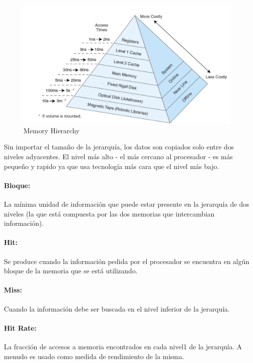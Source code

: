 \begin{figure}[ht]
	\centering
	\includegraphics[width=1\textwidth]{imagenes/memory-heriarchy}
	\caption{Memory Hierarchy}
	\label{fig:memory-hierarchy}
\end{figure}

Sin importar el tamaño de la jerarquía, los datos son copiados solo entre dos niveles adyacentes. El nivel más alto - el más cercano al procesador - es más pequeño y rapido ya que usa tecnología más cara que el nivel más bajo.

\paragraph{Bloque:} La mínima unidad de información que puede estar presente en la jerarquía de dos niveles (la que está compuesta por las dos memorias que intercambian información).

\paragraph{Hit:} Se produce cuando la información pedida por el procesador se encuentra en algún bloque de la memoria que se está utilizando.

\paragraph{Miss:} Cuando la información debe ser buscada en el nivel inferior de la jerarquía.

\paragraph{Hit Rate:} La fracción de accesos a memoria encontrados en cada nivel1 de la jerarquía. A menudo es usado como medida de rendimiento de la misma.

